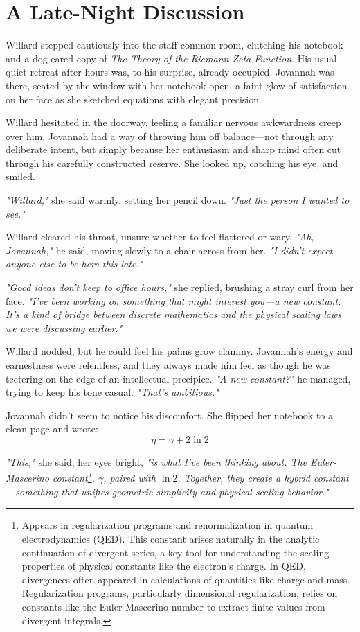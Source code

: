 \section*{A Late-Night Discussion}

Willard stepped cautiously into the staff common room, clutching his notebook and a dog-eared copy of \textit{The Theory of the Riemann Zeta-Function}. His usual quiet retreat after hours was, to his surprise, already occupied. Jovannah was there, seated by the window with her notebook open, a faint glow of satisfaction on her face as she sketched equations with elegant precision.

Willard hesitated in the doorway, feeling a familiar nervous awkwardness creep over him. Jovannah had a way of throwing him off balance—not through any deliberate intent, but simply because her enthusiasm and sharp mind often cut through his carefully constructed reserve. She looked up, catching his eye, and smiled.

\textit{"Willard,"} she said warmly, setting her pencil down. \textit{"Just the person I wanted to see."}

Willard cleared his throat, unsure whether to feel flattered or wary. \textit{"Ah, Jovannah,"} he said, moving slowly to a chair across from her. \textit{"I didn’t expect anyone else to be here this late."}

\textit{"Good ideas don’t keep to office hours,"} she replied, brushing a stray curl from her face. \textit{"I’ve been working on something that might interest you—a new constant. It’s a kind of bridge between discrete mathematics and the physical scaling laws we were discussing earlier."}

Willard nodded, but he could feel his palms grow clammy. Jovannah’s energy and earnestness were relentless, and they always made him feel as though he was teetering on the edge of an intellectual precipice. \textit{"A new constant?"} he managed, trying to keep his tone casual. \textit{"That’s ambitious."}

Jovannah didn’t seem to notice his discomfort. She flipped her notebook to a clean page and wrote:
\[
\eta = \gamma + 2\ln 2
\]

\textit{"This,"} she said, her eyes bright, \textit{"is what I’ve been thinking about. The Euler-Mascerino constant\footnote{Appears in regularization programs and renormalization in quantum electrodynamics (QED). This constant arises naturally in the analytic continuation of divergent series, a key tool for understanding the scaling properties of physical constants like the electron’s charge. In QED, divergences often appeared in calculations of quantities like charge and mass. Regularization programs, particularly dimensional regularization, relies on constants like the Euler-Mascerino number to extract finite values from divergent integrals.}, $\gamma$, paired with $\ln 2$. Together, they create a hybrid constant—something that unifies geometric simplicity and physical scaling behavior."}

